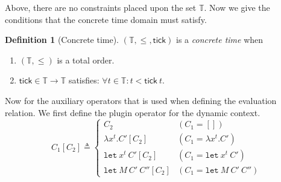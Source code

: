 \documentclass{article}
\theoremstyle{definition}
\newtheorem{definition}{Definition}[section]
\newcommand*{\Time}{\mathbb{T}}
\newcommand*{\tick}{\mathsf{tick}}
\begin{document}
Above, there are no constraints placed upon the set $\Time$.
Now we give the conditions that the concrete time domain must satisfy.

\begin{definition}[Concrete time]
  $(\Time, \le, \tick)$ is a \emph{concrete time} when
  \begin{enumerate}
    \item $(\Time, \le)$ is a total order.
    \item $\tick\in\Time\rightarrow\Time$ satisfies: $\forall t\in\Time: t < \tick\:t$.
  \end{enumerate}
\end{definition}

Now for the auxiliary operators that is used when defining the evaluation relation.
We first define the plugin operator for the dynamic context.
\[
  C_{1}[C_{2}]\triangleq
  \begin{cases}
    C_{2}                           & (C_{1}=[])                       \\
    \lambda x^{t}.C'[C_{2}]         & (C_{1}=\lambda x^{t}.C')         \\
    \mathtt{let}\:x^{t}\:C'[C_{2}]  & (C_{1}=\mathtt{let}\:x^{t}\:C')  \\
    \mathtt{let}\:M\:C'\:C''[C_{2}] & (C_{1}=\mathtt{let}\:M\:C'\:C'')
  \end{cases}
\]
\end{document}
